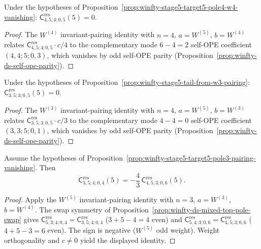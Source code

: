\begin{proposition}
\label{prop:winfty-stage5-target4-pole5-w4-vanishing}
Under the hypotheses of
Proposition~\ref{prop:winfty-stage5-target5-pole4-w4-vanishing}:
$\mathsf{C}^{\mathrm{res}}_{4,5;4;0,5}(5)=0$.
\end{proposition}

\begin{proof}
The $W^{(4)}$ invariant-pairing identity with \(n=4\), \(a=W^{(5)}\), \(b=W^{(4)}\) relates \(\mathsf{C}^{\mathrm{res}}_{4,5;4;0,5}\cdot c/4\) to the complementary mode \(6-4=2\) self-OPE coefficient \((4,4;5;0,3)\), which vanishes by odd self-OPE parity (Proposition~\ref{prop:winfty-ds-self-ope-parity}).
\end{proof}

\begin{proposition}
\label{prop:winfty-stage5-target3-pole5-w3-vanishing}
Under the hypotheses of
Proposition~\ref{prop:winfty-stage5-tail-from-w3-pairing}:
$\mathsf{C}^{\mathrm{res}}_{3,5;3;0,5}(5)=0$.
\end{proposition}

\begin{proof}
The $W^{(3)}$ invariant-pairing identity with \(n=4\), \(a=W^{(5)}\), \(b=W^{(3)}\) relates \(\mathsf{C}^{\mathrm{res}}_{3,5;3;0,5}\cdot c/3\) to the complementary mode \(4-4=0\) self-OPE coefficient \((3,3;5;0,1)\), which vanishes by odd self-OPE parity (Proposition~\ref{prop:winfty-ds-self-ope-parity}).
\end{proof}

\begin{proposition}
\label{prop:winfty-stage5-transport-cross-target-reduction}
Assume the hypotheses of
Proposition~\ref{prop:winfty-stage5-target5-pole3-pairing-vanishing}.
Then
\[
\mathsf{C}^{\mathrm{res}}_{3,5;4;0,4}(5)
=
-\frac{4}{3}\,
\mathsf{C}^{\mathrm{res}}_{4,5;3;0,6}(5).
\]
\end{proposition}

\begin{proof}
Apply the $W^{(5)}$ invariant-pairing identity with \(n=3\), \(a=W^{(3)}\), \(b=W^{(4)}\). The swap symmetry of Proposition~\ref{prop:winfty-ds-mixed-top-pole-swap} gives \(\mathsf{C}^{\mathrm{res}}_{5,3;4;0,4}=\mathsf{C}^{\mathrm{res}}_{3,5;4;0,4}\) (\(3+5-4=4\) even) and \(\mathsf{C}^{\mathrm{res}}_{5,4;3;0,6}=\mathsf{C}^{\mathrm{res}}_{4,5;3;0,6}\) (\(4+5-3=6\) even). The sign is negative (\(W^{(5)}\) odd weight). Weight orthogonality and \(c\neq 0\) yield the displayed identity.
\end{proof}

